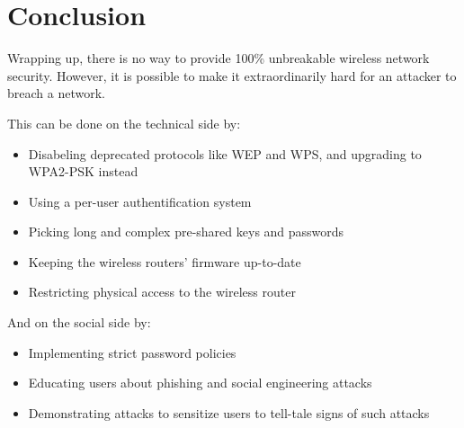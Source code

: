 \section{Conclusion}

Wrapping up, there is no way to provide 100\% unbreakable wireless network security. However, it is possible to make it extraordinarily hard for an attacker to breach a network. 

This can be done on the technical side by:

\begin{itemize}

\item{Disabeling deprecated protocols like WEP and WPS, and upgrading to WPA2-PSK instead}

\item{Using a per-user authentification system}

\item{Picking long and complex pre-shared keys and passwords}

\item{Keeping the wireless routers' firmware up-to-date}

\item{Restricting physical access to the wireless router}

\end{itemize}

And on the social side by:

\begin{itemize}

\item{Implementing strict password policies}

\item{Educating users about phishing and social engineering attacks}

\item{Demonstrating attacks to sensitize users to tell-tale signs of such attacks}

\end{itemize}